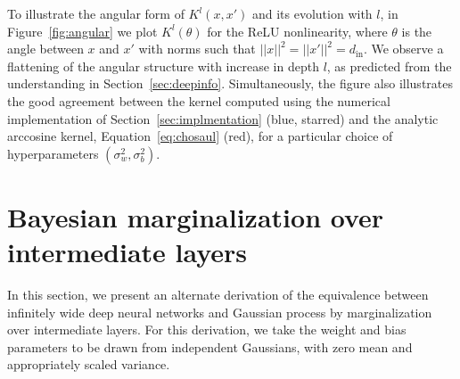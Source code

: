 \documentclass{article} %
\begin{document}
\begin{appendix}
To illustrate the angular form of $K^{l}(x,x')$ and its evolution with $l$, in Figure~\ref{fig:angular} we plot $K^{l}(\theta)$ for the ReLU nonlinearity, where $\theta$ is the angle between $x$ and $x'$ with norms such that $||x||^2 = ||x'||^2 = d_{\text{in}}$. We observe a flattening of the angular structure with increase in depth $l$, as predicted from the understanding in Section~\ref{sec:deepinfo}. Simultaneously, the figure also illustrates the good agreement between the kernel computed using the numerical implementation of Section~\ref{sec:implmentation} (blue, starred) and the analytic arccosine kernel, Equation~\ref{eq:chosaul} (red), for a particular choice of hyperparameters $(\sigma^2_w, \sigma^2_b)$. 


\section{Bayesian marginalization over intermediate layers}
\label{appendix:marginalization}
In this section, we present an alternate derivation of the equivalence between infinitely wide deep neural networks and Gaussian process by marginalization over intermediate layers. For this derivation, we take the weight and bias parameters to be drawn from independent Gaussians, with zero mean and appropriately scaled variance.


\end{appendix}
\end{document}
